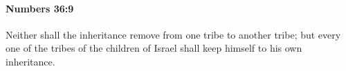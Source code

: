 
		\paragraph{Numbers 36:9} %
			\label{NUMBERS-36-9}

			Neither shall the inheritance remove from one tribe to another tribe; but every one of the tribes of the children of Israel shall keep himself to his own inheritance.


